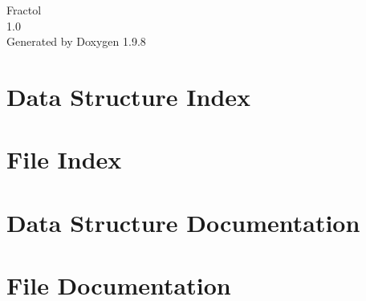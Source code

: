 \documentclass[twoside]{book}
\newcommand{\+}{\discretionary{\mbox{\scriptsize$\hookleftarrow$}}{}{}}
\newcommand{\clearemptydoublepage}{%
    \newpage{\pagestyle{empty}\cleardoublepage}%
  }
\begin{document}
  \raggedbottom
    \hypersetup{pageanchor=false,
                bookmarksnumbered=true,
                pdfencoding=unicode
               }
  \begin{titlepage}
  \vspace*{7cm}
  \begin{center}%
  {\Large Fractol}\\
  [1ex]\large 1.\+0 \\
  \vspace*{1cm}
  {\large Generated by Doxygen 1.9.8}\\
  \end{center}
  \end{titlepage}
  \clearemptydoublepage
  \tableofcontents
  \clearemptydoublepage
  \hypersetup{pageanchor=true}





\chapter{Data Structure Index}

\chapter{File Index}

\chapter{Data Structure Documentation}




\chapter{File Documentation}



















  \backmatter
  \newpage
  \clearemptydoublepage
  \printindex
\end{document}
